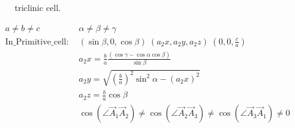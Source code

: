\documentclass{article}      %
\begin{document}
\begin{enumerate}
\begin{figure}[h!]
\caption{\small triclinic cell.}%
\label{Bravais:triclinic}
\end{figure}
\begin{displaymath}
	\begin{aligned}
	& a\neq b\neq c &\alpha\neq\beta\neq\gamma\\
	&\mathrm{In\_Primitive\_cell}:~&(\sin\beta,0,\cos\beta)\;(a_2x,a_2y,a_2z)\;(0,0,\frac{c}{a})\\
	& &a_2x=\frac{b}{a}\frac{(\cos\gamma-\cos\alpha\cos\beta)}{\sin\beta}\\
	& &a_2y=\sqrt{\left( \frac{b}{a} \right)^2\sin^2\alpha-(a_2x)^2}\\
	& &a_2z=\frac{b}{a}\cos\beta \\
		& &\cos(\angle\vec A_1\vec A_2)\neq\cos(\angle\vec A_2\vec A_3)\neq\cos(\angle\vec A_3\vec A_1)\neq0
	\end{aligned}
\end{displaymath}
\end{enumerate}
\end{document}
